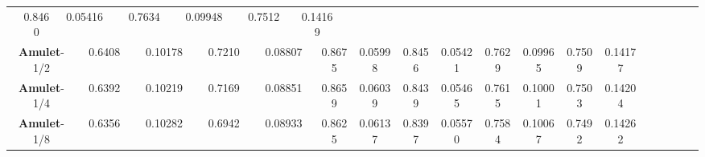 \documentclass[10pt,twocolumn,letterpaper]{article}
\begin{document}
\begin{table}
\begin{center}
\begin{tabular}{|c|c|c|c|c|c|c|c|c|c|c|c|c|c|c|c|c|c|c|c|c|c|c|c|c|||c|c|c|c|c|c|c|c|||}
&\multicolumn{2}{|c|}{\textcolor[rgb]{0,0,1}{0.8460}}&\multicolumn{2}{|c|}{\textcolor[rgb]{0,0,1}{0.05416}}%
&\multicolumn{2}{|c|}{\textcolor[rgb]{0,1,0}{0.7634}}&\multicolumn{2}{|c|}{\textcolor[rgb]{0,0,1}{0.09948}}%
&\multicolumn{2}{|c|}{\textcolor[rgb]{0,0,1}{0.7512}}&\multicolumn{2}{|c|}{\textcolor[rgb]{0,0,1}{0.14169}}%
\\
\multicolumn{4}{|c|}{\textbf{Amulet}-1/2}
&\multicolumn{2}{|c|}{0.6408}&\multicolumn{2}{|c|}{0.10178}%
&\multicolumn{2}{|c|}{0.7210}&\multicolumn{2}{|c|}{0.08807}%
&\multicolumn{2}{|c|}{\textcolor[rgb]{0,0,1}{0.8675}}&\multicolumn{2}{|c|}{0.05998}%
&\multicolumn{2}{|c|}{0.8456}&\multicolumn{2}{|c|}{0.05421}%
&\multicolumn{2}{|c|}{0.7629}&\multicolumn{2}{|c|}{0.09965}%
&\multicolumn{2}{|c|}{0.7509}&\multicolumn{2}{|c|}{0.14177}%
\\
\multicolumn{4}{|c|}{\textbf{Amulet}-1/4}
&\multicolumn{2}{|c|}{0.6392}&\multicolumn{2}{|c|}{0.10219}%
&\multicolumn{2}{|c|}{0.7169}&\multicolumn{2}{|c|}{0.08851}%
&\multicolumn{2}{|c|}{0.8659}&\multicolumn{2}{|c|}{0.06039}%
&\multicolumn{2}{|c|}{0.8439}&\multicolumn{2}{|c|}{0.05465}%
&\multicolumn{2}{|c|}{0.7615}&\multicolumn{2}{|c|}{0.10001}%
&\multicolumn{2}{|c|}{0.7503}&\multicolumn{2}{|c|}{0.14204}%
\\
\multicolumn{4}{|c|}{\textbf{Amulet}-1/8}
&\multicolumn{2}{|c|}{0.6356}&\multicolumn{2}{|c|}{0.10282}%
&\multicolumn{2}{|c|}{0.6942}&\multicolumn{2}{|c|}{0.08933}%
&\multicolumn{2}{|c|}{0.8625}&\multicolumn{2}{|c|}{0.06137}%
&\multicolumn{2}{|c|}{0.8397}&\multicolumn{2}{|c|}{0.05570}%
&\multicolumn{2}{|c|}{0.7584}&\multicolumn{2}{|c|}{0.10067}%
&\multicolumn{2}{|c|}{0.7492}&\multicolumn{2}{|c|}{0.14262}%

\end{tabular}
\end{center}
\end{table}
\end{document}

